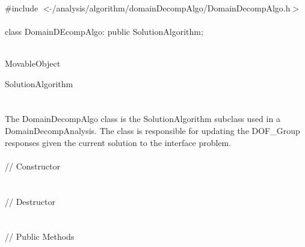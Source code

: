 
   \\
\indent \#include $<\tilde{
}$/analysis/algorithm/domainDecompAlgo/DomainDecompAlgo.h$>$  \\  

  \\
class DomainDEcompAlgo: public SolutionAlgorithm;  


 \\
MovableObject 

\indent\indent SolutionAlgorithm \\
\indent\indent{} \\

 \\ 
\indent The DomainDecompAlgo class is the SolutionAlgorithm subclass
used in a DomainDecompAnalysis. The class is responsible for updating
the DOF\_Group responses given the current solution to the interface
problem. \\ 

 \\ 
\indent\indent // Constructor \\ 
\indent{}\\ \\
\indent\indent // Destructor \\
\indent{}\\  \\
\indent\indent // Public Methods  \\
\indent{} \\
\indent{}\\
\indent{}\\
\indent{} \\



